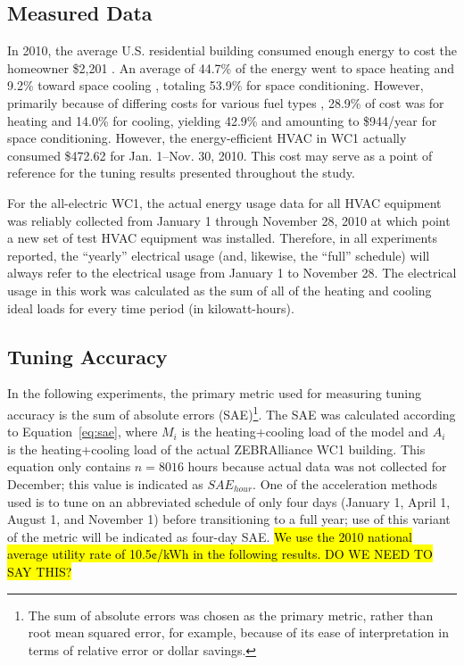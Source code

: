 \documentclass[preprint, review, 12pt]{elsarticle}
\begin{document}
\subsection{Measured Data}
In 2010, the average U.S. residential building consumed enough energy to cost the homeowner \$2,201 \cite{cit:doe2012a}. An average of 44.7\% of the energy went to space heating and 9.2\% toward space cooling \cite{cit:doe2012b}, totaling 53.9\% for space conditioning. However, primarily because of differing costs for various fuel types \cite{cit:doe2012c}, 28.9\% of cost was for heating and 14.0\% for cooling, yielding 42.9\% and amounting to \$944/year for space conditioning. However, the energy-efficient HVAC in WC1 actually consumed \$472.62 for Jan. 1--Nov. 30, 2010. This cost may serve as a point of reference for the tuning results presented throughout the study.

For the all-electric WC1, the actual energy usage data for all HVAC equipment was reliably collected from January 1 through November 28, 2010 at which point a new set of test HVAC equipment was installed. Therefore, in all experiments reported, the ``yearly'' electrical usage (and, likewise, the ``full'' schedule) will always refer to the electrical usage from January 1 to November 28. The electrical usage in this work was calculated as the sum of all of the heating and cooling ideal loads for every time period (in kilowatt-hours).

\subsection{Tuning Accuracy}
In the following experiments, the primary metric used for measuring tuning accuracy is the sum of absolute errors (SAE)\footnote{The sum of absolute errors was chosen as the primary metric, rather than root mean squared error, for example, because of its ease of interpretation in terms of relative error or dollar savings.}. The SAE was calculated according to Equation~\ref{eq:sae}, where $M_i$ is the heating+cooling load of the model and $A_i$ is the heating+cooling load of the actual ZEBRAlliance WC1 building. This equation only contains $n=8016$ hours because actual data was not collected for December; this value is indicated as $SAE_{hour}$. One of the acceleration methods used is to tune on an abbreviated schedule of only four days (January 1, April 1, August 1, and November 1) before transitioning to a full year; use of this variant of the metric will be indicated as four-day SAE. \hl{We use the 2010 national average utility rate of 10.5¢/kWh in the following results. DO WE NEED TO SAY THIS?}
\end{document}
